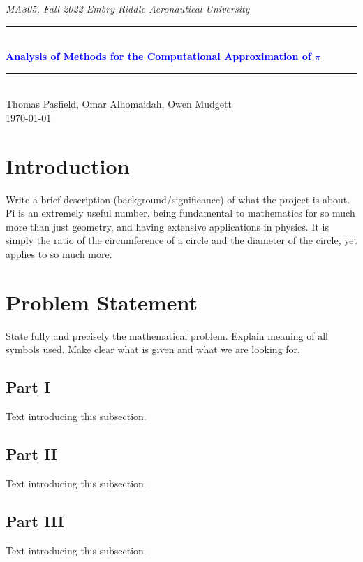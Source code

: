 \documentclass[11pt]{article}
\newcommand{\horrule}[1]{\rule{\linewidth}{#1}} 	%
\begin{document}
\begin{center}
{\it MA305, Fall 2022  \hfill Embry-Riddle Aeronautical University
 }\\
		\horrule{0.5pt} \\[0.4cm]
		\textcolor{blue}{\bf \Large  %
			Analysis of Methods for the Computational Approximation of $\pi$
			}\\
		\horrule{2pt} \\[5cm]
		Thomas Pasfield, Omar Alhomaidah, Owen Mudgett  %
\\[0.4cm]
\today %
\end{center}
\thispagestyle{empty}
\newpage
\begin{abstract}
\end{abstract}
\tableofcontents 
\newpage

\section{Introduction}\label{S:1}
Write a brief description (background/significance) of what the project is about. \\

Pi is an extremely useful number, being fundamental to mathematics for so much more than just geometry, and having extensive applications in physics. It is simply the ratio of the circumference of a circle and the diameter of the circle, yet applies to so much more.


\section{Problem Statement}\label{S:2}
State fully and precisely the mathematical problem.  
Explain meaning of all symbols used. Make clear what is given and what we are looking for. 

\subsection{Part I}\label{S:2.1}
%
Text introducing this subsection. 

\subsection{Part II}\label{S:2.2}
%
Text introducing this subsection. 
\subsection{Part III}\label{S:2.3}
%
Text introducing this subsection.
\end{document}
